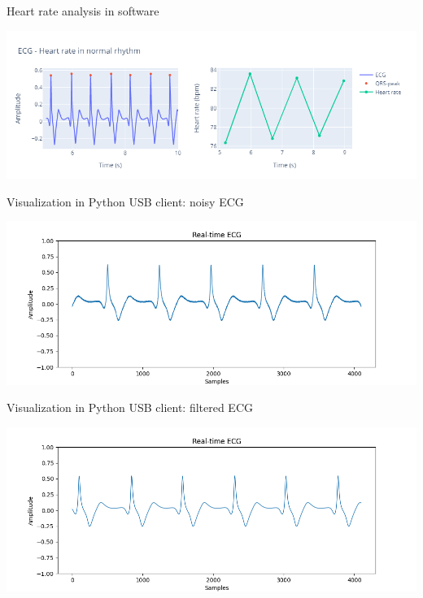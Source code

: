 \begin{frame}{Heart rate analysis in software}
\begin{minipage}[c][0.5\textheight][c]{\linewidth}
\begin{center}
    \includegraphics[width=\textwidth]{images/heart_rate/heart_rate_software.png}  
\end{center}
\end{minipage}
\end{frame}

\begin{frame}{Visualization in Python USB client: noisy ECG}
\begin{minipage}[c][0.5\textheight][c]{\linewidth}
\begin{center}
    \includegraphics[width=\textwidth]{images/DAQ/daq_ecg_noise.png} 
\end{center}
\end{minipage}
\end{frame}

\begin{frame}{Visualization in Python USB client: filtered ECG}
\begin{minipage}[c][0.5\textheight][c]{\linewidth}
\begin{center}
    \includegraphics[width=\textwidth]{images/DAQ/daq_ecg_filtered.png} 
\end{center}
\end{minipage}
\end{frame}

